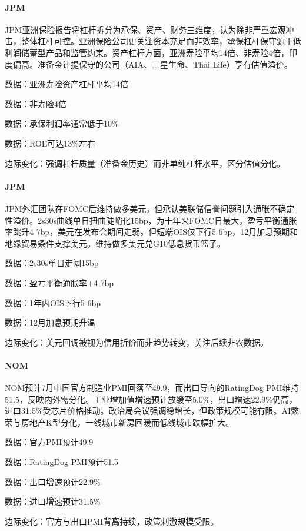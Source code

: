 \documentclass[11pt]{ctexart}
\begin{document}
\paragraph{JPM} JPM亚洲保险报告将杠杆拆分为承保、资产、财务三维度，认为除非严重宏观冲击，整体杠杆可控。亚洲保险公司更关注资本充足而非效率，承保杠杆保守源于低利润储蓄型产品和监管约束。资产杠杆方面，亚洲寿险平均14倍、非寿险4倍，印度偏高。准备金计提保守的公司（AIA、三星生命、Thai Life）享有估值溢价。
{\small\color{refgray}数据：亚洲寿险资产杠杆平均14倍\par}
{\small\color{refgray}数据：非寿险4倍\par}
{\small\color{refgray}数据：承保利润率通常低于10\%\par}
{\small\color{refgray}数据：ROE可达13\%左右\par}
{\small\color{refgray}边际变化：强调杠杆质量（准备金历史）而非单纯杠杆水平，区分估值分化。\par}
\paragraph{JPM} JPM外汇团队在FOMC后维持做多美元，但承认美联储信誉问题引入通胀不确定性溢价。2s30s曲线单日扭曲陡峭化15bp，为十年来FOMC日最大，盈亏平衡通胀率跳升4-7bp，美元在发布会期间走弱。但短端OIS仅下行5-6bp，12月加息预期和地缘贸易条件支撑美元。维持做多美元兑G10低息货币篮子。
{\small\color{refgray}数据：2s30s单日走阔15bp\par}
{\small\color{refgray}数据：盈亏平衡通胀率+4-7bp\par}
{\small\color{refgray}数据：1年内OIS下行5-6bp\par}
{\small\color{refgray}数据：12月加息预期升温\par}
{\small\color{refgray}边际变化：美元回调被视为信用折价而非趋势转变，关注后续非农数据。\par}
\paragraph{NOM} NOM预计7月中国官方制造业PMI回落至49.9，而出口导向的RatingDog PMI维持51.5，反映内外需分化。工业增加值增速预计放缓至5.0\%，出口增速22.9\%仍高，进口31.5\%受芯片价格推动。政治局会议强调稳增长，但政策规模可能有限。AI繁荣与房地产K型分化，一线城市新房回暖而低线城市跌幅扩大。
{\small\color{refgray}数据：官方PMI预计49.9\par}
{\small\color{refgray}数据：RatingDog PMI预计51.5\par}
{\small\color{refgray}数据：出口增速预计22.9\%\par}
{\small\color{refgray}数据：进口增速预计31.5\%\par}
{\small\color{refgray}边际变化：官方与出口PMI背离持续，政策刺激规模受限。\par}
\end{document}
